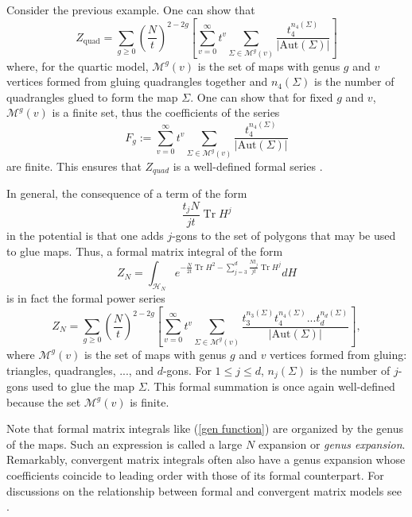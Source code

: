 \documentclass[10pt]{article}
\DeclareMathOperator{\tr}{Tr}
\begin{document}
\begin{appendices}
	
	Consider the previous example. One can show that 
	\begin{equation*}
		Z_{\text{quad}} = \sum_{g \geq 0}\left(\frac{N}{t}\right)^{2-2g}\left[ \sum_{v=0}^{\infty}t^{v}\sum_{\Sigma\in \mathcal{M}^{g}(v)}\frac{t_{4}^{n_{4}(\Sigma)}}{|\text{Aut}(\Sigma)|}\right] 
	\end{equation*}
	where, for the quartic model, $\mathcal{M}^{g}(v)$ is the set of maps with genus $g$ and $v$ vertices formed from gluing quadrangles together and $n_4 (\Sigma)$ is the number of quadrangles glued to form the map $\Sigma$. One can show that for fixed $g$ and $v$, $\mathcal{M}^{g}(v)$ is a finite set, thus the coefficients of the series 
	\begin{equation}\label{free energy expansion}
		F_{g} :=  \sum_{v=0}^{\infty}t^{v}\sum_{\Sigma\in \mathcal{M}^{g}(v)}\frac{t_{4}^{n_{4}(\Sigma)}}{|\text{Aut}(\Sigma)|}
	\end{equation}
	are finite. This ensures that $Z_{quad}$ is a well-defined formal series  \cite{Eynard2018}.
	
	In general, the consequence of a term of the form
	\begin{equation*}
		\frac{t_{j}N}{j t} \tr H^{j}
	\end{equation*}
	in the potential is that one adds  $j$-gons to the set of  polygons that may be used to glue maps. Thus, a formal matrix integral of the form
	\begin{equation*}
		Z_N = \int_{\mathcal{H}_{N}}e^{-\frac{N}{2t}\tr H^{2} - \sum_{j=3}^{d}\frac{N t_j}{jt}\tr H^{j}}dH
	\end{equation*} 
	is in fact the formal power series
	\begin{equation}\label{gen function}
		Z_N = \sum_{g \geq 0}\left(\frac{N}{t}\right)^{2-2g} \left[\sum_{v=0}^{\infty}t^{v}\sum_{\Sigma\in \mathcal{M}^{g}(v)}\frac{t_{3}^{n_{3}(\Sigma)}t_{4}^{n_{4}(\Sigma)}... t_{d}^{n_{d}(\Sigma)}}{|\text{Aut}(\Sigma)|}\right],
	\end{equation}
	where  $\mathcal{M}^{g}(v)$ is the set of maps with genus $g$ and $v$ vertices formed from gluing:
	triangles, quadrangles, ..., and  $d$-gons. For $1\leq j \leq d$,  $n_j (\Sigma)$  is the number of $j$-gons used to glue the map $\Sigma$. This formal summation is once again well-defined because the set  $\mathcal{M}^{g}(v)$ is finite.
	
	Note that formal matrix integrals like (\ref{gen function}) are organized by the genus of the maps. Such an expression is called a  large $N$ expansion or \textit{genus expansion}. Remarkably, convergent matrix integrals often also have a genus expansion whose coefficients coincide to leading order with those of its formal counterpart. For discussions on the relationship between formal and convergent matrix models see \cite{Eynard combin}.
	

\end{appendices}
\end{document}
